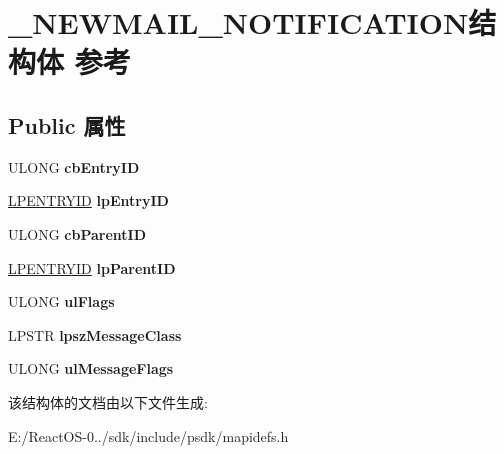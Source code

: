 \hypertarget{struct___n_e_w_m_a_i_l___n_o_t_i_f_i_c_a_t_i_o_n}{}\section{\+\_\+\+N\+E\+W\+M\+A\+I\+L\+\_\+\+N\+O\+T\+I\+F\+I\+C\+A\+T\+I\+O\+N结构体 参考}
\label{struct___n_e_w_m_a_i_l___n_o_t_i_f_i_c_a_t_i_o_n}
\subsection*{Public 属性}
\begin{DoxyCompactItemize}
\item 
\mbox{\label{struct___n_e_w_m_a_i_l___n_o_t_i_f_i_c_a_t_i_o_n_a8e594bba3282821c0468696d98dd5ce5}} 
U\+L\+O\+NG {\bfseries cb\+Entry\+ID}
\item 
\mbox{\label{struct___n_e_w_m_a_i_l___n_o_t_i_f_i_c_a_t_i_o_n_a1f8f6762d61368a392acaff8a8225dce}} 
\hyperlink{struct___e_n_t_r_y_i_d}{L\+P\+E\+N\+T\+R\+Y\+ID} {\bfseries lp\+Entry\+ID}
\item 
\mbox{\label{struct___n_e_w_m_a_i_l___n_o_t_i_f_i_c_a_t_i_o_n_abb107f741152d66f65ff72a9e5a518d1}} 
U\+L\+O\+NG {\bfseries cb\+Parent\+ID}
\item 
\mbox{\label{struct___n_e_w_m_a_i_l___n_o_t_i_f_i_c_a_t_i_o_n_a34e003bb12f3a6e96dfe4f1654327d47}} 
\hyperlink{struct___e_n_t_r_y_i_d}{L\+P\+E\+N\+T\+R\+Y\+ID} {\bfseries lp\+Parent\+ID}
\item 
\mbox{\label{struct___n_e_w_m_a_i_l___n_o_t_i_f_i_c_a_t_i_o_n_aadfb2a41cc3fc6b33129f19cb9dbc13a}} 
U\+L\+O\+NG {\bfseries ul\+Flags}
\item 
\mbox{\label{struct___n_e_w_m_a_i_l___n_o_t_i_f_i_c_a_t_i_o_n_a025c8801873d629fbde81d7ce6a47462}} 
L\+P\+S\+TR {\bfseries lpsz\+Message\+Class}
\item 
\mbox{\label{struct___n_e_w_m_a_i_l___n_o_t_i_f_i_c_a_t_i_o_n_af0c051a7bdf0a261ee21c109e884c5b3}} 
U\+L\+O\+NG {\bfseries ul\+Message\+Flags}
\end{DoxyCompactItemize}


该结构体的文档由以下文件生成\+:\begin{DoxyCompactItemize}
\item 
E\+:/\+React\+O\+S-\/0../sdk/include/psdk/mapidefs.\+h\end{DoxyCompactItemize}
